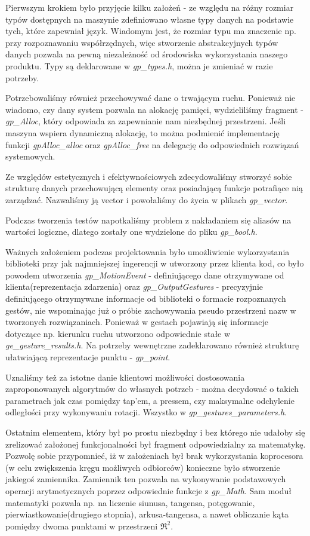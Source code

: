 \documentclass[a4paper,12pt]{article}
\begin{document}
Pierwszym krokiem było przyjęcie kilku założeń - ze względu na różny rozmiar typów dostępnych na maszynie zdefiniowano własne typy danych na podstawie tych, które zapewniał język. Wiadomym jest, że rozmiar typu ma znaczenie np. przy rozpoznawaniu współrzędnych, więc stworzenie abstrakcyjnych typów danych pozwala na pewną niezależność od środowiska wykorzystania naszego produktu. Typy są deklarowane w \textit{gp_types.h}, można je zmieniać w razie potrzeby. 

Potrzebowaliśmy również przechowywać dane o trwającym ruchu. Ponieważ nie wiadomo, czy dany system pozwala na alokację pamięci, wydzieliliśmy fragment - \textit{gp_Alloc}, który odpowiada za zapewnianie nam niezbędnej przestrzeni. Jeśli maszyna wspiera dynamiczną alokację, to można podmienić implementację funkcji \textit{gpAlloc_alloc} oraz \textit{gpAlloc_free} na delegację do odpowiednich rozwiązań systemowych. 

Ze względów estetycznych i efektywnościowych zdecydowaliśmy stworzyć sobie strukturę danych przechowującą elementy oraz posiadającą funkcje potrafiące nią zarządzać. Nazwaliśmy ją vector i powołaliśmy do życia w plikach \textit{gp_vector}. 

Podczas tworzenia testów napotkaliśmy problem z nakładaniem się aliasów na wartości logiczne, dlatego zostały one wydzielone do pliku \textit{gp_bool.h}. 

Ważnych założeniem podczas projektowania było umożliwienie wykorzystania biblioteki przy jak najmniejszej ingerencji w utworzony przez klienta kod, co było powodem utworzenia \textit{gp_MotionEvent} - definiującego dane otrzymywane od klienta(reprezentacja zdarzenia) oraz \textit{gp_OutputGestures} - precyzyjnie definiującego otrzymywane informacje od biblioteki o formacie rozpoznanych gestów, nie wspominając już o próbie zachowywania pseudo przestrzeni nazw w tworzonych rozwiązaniach. Ponieważ w gestach pojawiają się informacje dotyczące np. kierunku ruchu utworzono odpowiednie stałe w \textit{ge_gesture_results.h}. Na potrzeby wewnętrzne zadeklarowano również strukturę ułatwiającą reprezentacje punktu - \textit{gp_point}. 

Uznaliśmy też za istotne danie klientowi możliwości dostosowania zaproponowanych algorytmów do własnych potrzeb - można decydować o takich parametrach jak czas pomiędzy tap'em, a pressem, czy maksymalne odchylenie odległości przy wykonywaniu rotacji. Wszystko w \textit{gp_gestures_parameters.h}. 

Ostatnim elementem, który był po prostu niezbędny i bez którego nie udałoby się zrelizować założonej funkcjonalności był fragment odpowiedzialny za matematykę. Pozwolę sobie przypomnieć, iż w założeniach był brak wykorzystania koprocesora (w celu zwiększenia kręgu możliwych odbiorców) konieczne było stworzenie jakiegoś zamiennika. Zamiennik ten pozwala na wykonywanie podstawowych operacji arytmetycznych poprzez odpowiednie funkcje z \textit{gp_Math}. Sam moduł matematyki pozwala np. na liczenie siunusa, tangensa, potęgowanie, pierwiastkowanie(drugiego stopnia), arkusa-tangensa, a nawet obliczanie kąta pomiędzy dwoma punktami w przestrzeni $\Re^2$. 
\end{document}
